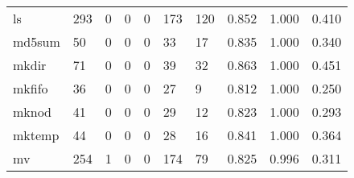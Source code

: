 \begin{longtable}{lp{2.0cm}p{2.0cm}p{2.0cm}p{2.0cm}p{2.0cm}p{2.0cm}p{2.0cm}p{2.0cm}p{2.0cm}}
ls        &                    293 &                                             0 &                                            0 &                                           0 &                                          173 &                                        120 &                                0.852 &                                  1.000 &                                0.410 \\
md5sum    &                     50 &                                             0 &                                            0 &                                           0 &                                           33 &                                         17 &                                0.835 &                                  1.000 &                                0.340 \\
mkdir     &                     71 &                                             0 &                                            0 &                                           0 &                                           39 &                                         32 &                                0.863 &                                  1.000 &                                0.451 \\
mkfifo    &                     36 &                                             0 &                                            0 &                                           0 &                                           27 &                                          9 &                                0.812 &                                  1.000 &                                0.250 \\
mknod     &                     41 &                                             0 &                                            0 &                                           0 &                                           29 &                                         12 &                                0.823 &                                  1.000 &                                0.293 \\
mktemp    &                     44 &                                             0 &                                            0 &                                           0 &                                           28 &                                         16 &                                0.841 &                                  1.000 &                                0.364 \\
mv        &                    254 &                                             1 &                                            0 &                                           0 &                                          174 &                                         79 &                                0.825 &                                  0.996 &                                0.311 \\

\end{longtable}
